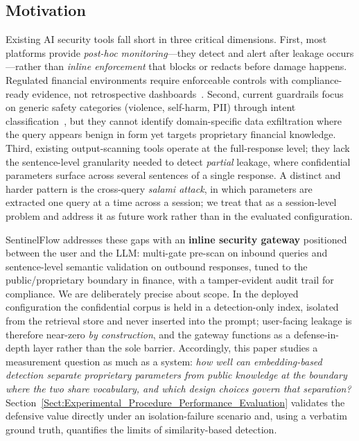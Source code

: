 \documentclass[journal]{IEEEtran}
\begin{document}
\subsection{Motivation}

Existing AI security tools fall short in three critical dimensions. First, most platforms provide \textit{post-hoc monitoring}---they detect and alert after leakage occurs---rather than \textit{inline enforcement} that blocks or redacts before damage happens. Regulated financial environments require enforceable controls with compliance-ready evidence, not retrospective dashboards~\cite{nist_ai_rmf, nist_ai_600_1}. Second, current guardrails focus on generic safety categories (violence, self-harm, PII) through intent classification~\cite{llama_guard, ms_prompt_shields}, but they cannot identify domain-specific data exfiltration where the query appears benign in form yet targets proprietary financial knowledge. Third, existing output-scanning tools operate at the full-response level; they lack the sentence-level granularity needed to detect \textit{partial} leakage, where confidential parameters surface across several sentences of a single response. A distinct and harder pattern is the cross-query \textit{salami attack}, in which parameters are extracted one query at a time across a session; we treat that as a session-level problem and address it as future work rather than in the evaluated configuration.

SentinelFlow addresses these gaps with an \textbf{inline security gateway} positioned between the user and the LLM: multi-gate pre-scan on inbound queries and sentence-level semantic validation on outbound responses, tuned to the public/proprietary boundary in finance, with a tamper-evident audit trail for compliance. We are deliberately precise about scope. In the deployed configuration the confidential corpus is held in a detection-only index, isolated from the retrieval store and never inserted into the prompt; user-facing leakage is therefore near-zero \textit{by construction}, and the gateway functions as a defense-in-depth layer rather than the sole barrier. Accordingly, this paper studies a measurement question as much as a system: \textit{how well can embedding-based detection separate proprietary parameters from public knowledge at the boundary where the two share vocabulary, and which design choices govern that separation?} Section~\ref{Sect:Experimental_Procedure_Performance_Evaluation} validates the defensive value directly under an isolation-failure scenario and, using a verbatim ground truth, quantifies the limits of similarity-based detection.
\end{document}

